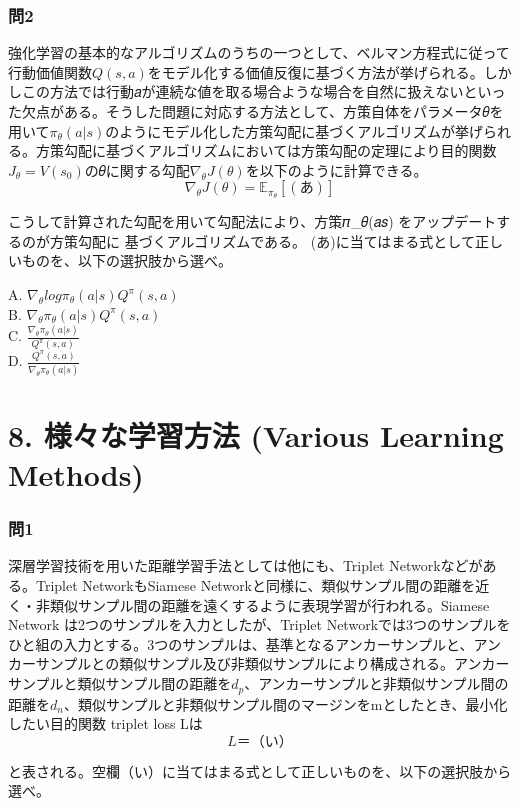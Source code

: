 \documentclass[
  letterpaper,
  DIV=11,
  numbers=noendperiod]{scrreprt}
\begin{document}
\subsection{問2}\label{ux554f2-4}

強化学習の基本的なアルゴリズムのうちの一つとして、ベルマン方程式に従って行動価値関数\(𝑄(𝑠, 𝑎)\)をモデル化する価値反復に基づく方法が挙げられる。しかしこの方法では行動𝑎が連続な値を取る場合ような場合を自然に扱えないといった欠点がある。そうした問題に対応する方法として、方策自体をパラメータ𝜃を用いて\(𝜋_𝜃(𝑎|𝑠)\)のようにモデル化した方策勾配に基づくアルゴリズムが挙げられる。方策勾配に基づくアルゴリズムにおいては方策勾配の定理により目的関数\(𝐽_𝜃 = 𝑉(𝑠_0)\)の𝜃に関する勾配\(∇_𝜃𝐽(𝜃)\)を以下のように計算できる。
\[
∇_𝜃𝐽(𝜃) = 𝔼_{𝜋_𝜃}[(あ)]
\]

こうして計算された勾配を用いて勾配法により、方策𝜋\_𝜃(𝑎\textbar 𝑠)
をアップデートするのが方策勾配に 基づくアルゴリズムである。
(あ)に当てはまる式として正しいものを、以下の選択肢から選べ。

A. \(∇_𝜃log𝜋_𝜃(𝑎|𝑠)𝑄^𝜋(𝑠,𝑎)\)\\
B. \(∇_𝜃𝜋_𝜃(𝑎|𝑠)𝑄^𝜋(𝑠,𝑎)\)\\
C. \(\frac{∇_𝜃𝜋_𝜃(𝑎|𝑠)}{𝑄^𝜋(𝑠,𝑎)}\)\\
D. \(\frac{𝑄^𝜋(𝑠,𝑎)}{∇_𝜃𝜋_𝜃(𝑎|𝑠)}\)

\chapter{8. 様々な学習方法 (Various Learning
Methods)}\label{ux69d8ux3005ux306aux5b66ux7fd2ux65b9ux6cd5-various-learning-methods}

\subsection{問1}\label{ux554f1-9}

深層学習技術を用いた距離学習手法としては他にも、Triplet
Networkなどがある。Triplet NetworkもSiamese
Networkと同様に、類似サンプル間の距離を近く・非類似サンプル間の距離を遠くするように表現学習が行われる。Siamese
Network は2つのサンプルを入力としたが、Triplet
Networkでは3つのサンプルをひと組の入力とする。3つのサンプルは、基準となるアンカーサンプルと、アンカーサンプルとの類似サンプル及び非類似サンプルにより構成される。アンカーサンプルと類似サンプル間の距離を\({d_p}\)、アンカーサンプルと非類似サンプル間の距離を\({d_n}\)、類似サンプルと非類似サンプル間のマージンをmとしたとき、最小化したい目的関数
triplet loss Lは \[
L ＝（い）
\]

と表される。空欄（い）に当てはまる式として正しいものを、以下の選択肢から選べ。
\end{document}
